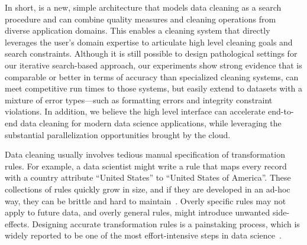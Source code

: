 In short, \sys is a new, simple architecture that models data cleaning as a search procedure and can combine quality measures and cleaning operations from diverse application domains.   This enables a cleaning system that directly leverages the user's domain expertise to articulate high level cleaning goals and search constraints.  Although it is still possible to design pathological settings for our iterative search-based approach, our experiments show strong evidence that \sys is comparable or better in terms of accuracy than specialized cleaning systems, can meet competitive run times to those systems, but easily extend to datasets with a mixture of error types---such as formatting errors and integrity constraint violations.   In addition, we believe the high level interface can accelerate end-to-end data cleaning for modern data science applications, while leveraging the substantial parallelization opportunities brought by the cloud.  





Data cleaning usually involves tedious manual specification of transformation rules.
For example, a data scientist might write a rule that maps every record with a \textsf{country} attribute ``United States'' to ``United States of America''.
These collections of rules quickly grow in size, and if they are developed in an ad-hoc way, they can be brittle and hard to maintain~\cite{krishnan2016hilda}.
Overly specific rules may not apply to future data, and overly general rules, might introduce unwanted side-effects.
Designing accurate transformation rules is a painstaking process, which is widely reported to be one of the most effort-intensive steps in data science~\cite{nytimes}.

